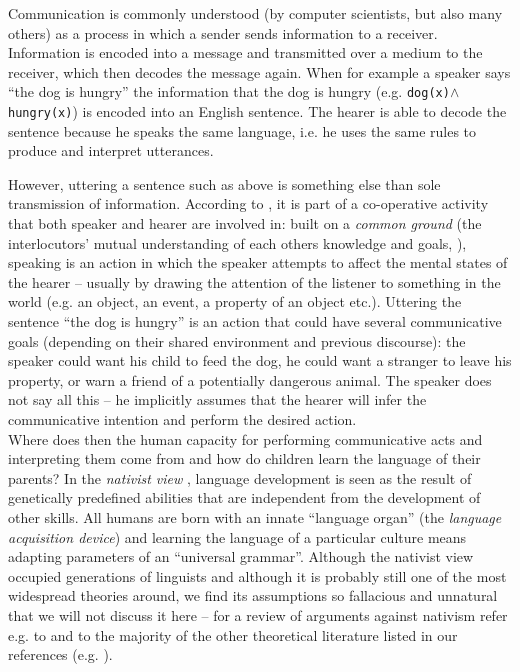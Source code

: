 Communication is commonly understood (by computer scientists, but also
many others) as a process in which a sender sends information to a
receiver. Information is encoded into a message and transmitted over a
medium to the receiver, which then decodes the message again. When for
example a speaker says ``the dog is hungry'' the information that the
dog is hungry (e.g. {\tt dog(x)}$\wedge$ {\tt hungry(x)}) is encoded
into an English sentence. The hearer is able to decode the sentence
because he speaks the same language, i.e. he uses the same rules to
produce and interpret utterances. 

However, uttering a sentence such as above is something else than sole
transmission of information. According to \cite{tomasello99cultural},
it is part of a co-operative activity that both speaker and hearer are
involved in: built on a \emph{common ground} (the interlocutors'
mutual understanding of each others knowledge and goals,
\citealp{clark91grounding}), speaking is an action in which the
speaker attempts to affect the mental states of the hearer -- usually
by drawing the attention of the listener to something in the world
(e.g. an object, an event, a property of an object etc.). Uttering the
sentence ``the dog is hungry'' is an action that could have several
communicative goals (depending on their shared environment and
previous discourse): the speaker could want his child to feed the dog,
he could want a stranger to leave his property, or warn a friend of a
potentially dangerous animal. The speaker does not say all this -- he
implicitly assumes that the hearer will infer the communicative
intention and perform the desired action.\\


\noindent Where does then the human capacity for performing communicative acts
and interpreting them come from and how do children learn the language
of their parents? In the \emph{nativist view}
\citep*{chomsky57syntactic-structures,pinker90natural,hauser02faculty},
language development is seen as the result of genetically predefined
abilities that are independent from the development of other
skills. All humans are born with an innate ``language organ'' (the
\emph{language acquisition device}) and learning the language of a
particular culture means adapting parameters of an ``universal
grammar''. Although the nativist view occupied generations of
linguists and although it is probably still one of the most widespread
theories around, we find its assumptions so fallacious and unnatural
that we will not discuss it here -- for a review of arguments against
nativism refer e.g. to \cite{tomasello05beyond} and to the majority of
the other theoretical literature listed in our references
(e.g. \citealp{steels03evolution}).

